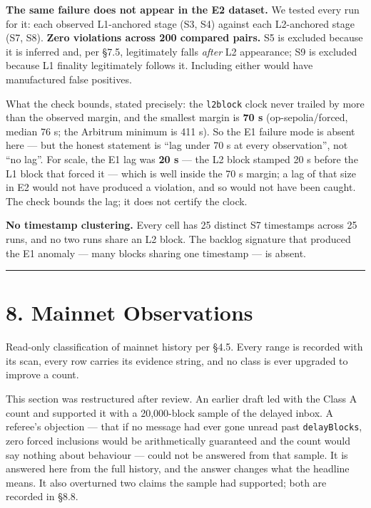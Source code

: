 \documentclass[conference]{IEEEtran}
\renewcommand{\_}{\textunderscore\allowbreak}
\begin{document}
\textbf{The same failure does not appear in the E2 dataset.} We tested
every run for it: each observed L1-anchored stage (S3, S4) against each
L2-anchored stage (S7, S8). \textbf{Zero violations across 200 compared
pairs.} S5 is excluded because it is inferred and, per §7.5,
legitimately falls \emph{after} L2 appearance; S9 is excluded because L1
finality legitimately follows it. Including either would have
manufactured false positives.

What the check bounds, stated precisely: the \texttt{l2\_block} clock
never trailed by more than the observed margin, and the smallest margin
is \textbf{70 s} (op-sepolia/forced, median 76 s; the Arbitrum minimum
is 411 s). So the E1 failure mode is absent here --- but the honest
statement is ``lag under 70 s at every observation'', not ``no lag''.
For scale, the E1 lag was \textbf{20 s} --- the L2 block stamped 20 s
before the L1 block that forced it --- which is well inside the 70 s
margin; a lag of that size in E2 would not have produced a violation,
and so would not have been caught. The check bounds the lag; it does not
certify the clock.

\textbf{No timestamp clustering.} Every cell has 25 distinct S7
timestamps across 25 runs, and no two runs share an L2 block. The
backlog signature that produced the E1 anomaly --- many blocks sharing
one timestamp --- is absent.

\begin{center}\rule{0.5\linewidth}{0.5pt}\end{center}

\section{8. Mainnet Observations}\label{mainnet-observations}

Read-only classification of mainnet history per §4.5. Every range is
recorded with its scan, every row carries its evidence string, and no
class is ever upgraded to improve a count.

This section was restructured after review. An earlier draft led with
the Class A count and supported it with a 20,000-block sample of the
delayed inbox. A referee's objection --- that if no message had ever
gone unread past \texttt{delayBlocks}, zero forced inclusions would be
arithmetically guaranteed and the count would say nothing about
behaviour --- could not be answered from that sample. It is answered
here from the full history, and the answer changes what the headline
means. It also overturned two claims the sample had supported; both are
recorded in §8.8.
\end{document}
